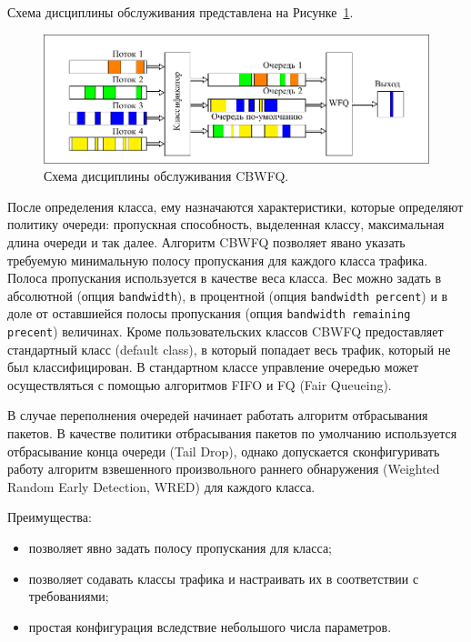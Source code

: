 	Схема дисциплины обслуживания представлена на Рисунке~\ref{pic:cbwfqscheme}. 

 	\begin{figure}[ht!]
		\center
    	\includegraphics[scale=1.1]{pdfimages/cbwfq.pdf}
		\caption{Схема дисциплины обслуживания CBWFQ.}
		\label{pic:cbwfqscheme}
	\end{figure}   

    После определения класса, ему назначаются характеристики, которые определяют
    политику очереди: пропускная способность, выделенная классу, максимальная
    длина очереди и так далее. Алгоритм CBWFQ позволяет явано указать требуемую минимальную
    полосу пропускания для каждого класса трафика. Полоса пропускания используется
    в качестве веса класса. Вес можно задать в абсолютной (опция \texttt{bandwidth}),
    в процентной (опция \texttt{bandwidth percent}) и в доле от оставшиейся
    полосы пропускания (опция \texttt{bandwidth remaining precent}) величинах.
    Кроме пользовательских классов CBWFQ предоставляет стандартный класс (default class),
    в который попадает весь трафик, который не был классифицирован. В стандартном классе
    управление очередью может осуществляться с помощью алгоритмов FIFO и FQ (Fair Queueing). \cite{ciscoguide} 

    В случае переполнения очередей начинает работать алгоритм отбрасывания пакетов.
    В качестве политики отбрасывания пакетов по умолчанию используется отбрасывание конца
    очереди (Tail Drop), однако допускается сконфигуривать работу
    алгоритм взвешенного произвольного раннего обнаружения (Weighted Random Early Detection, WRED)
    для каждого класса.\cite{ciscoguide}



	Преимущества:
	\begin{itemize}
		\item позволяет явно задать полосу пропускания для класса;
		\item позволяет содавать классы трафика и настраивать их в соответствии с требованиями;
		\item простая конфигурация вследствие небольшого числа параметров.\cite{Vagesna}\cite{ciscoguide}
	\end{itemize}

